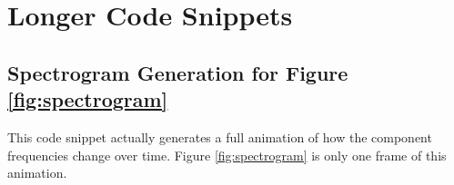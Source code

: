 %

\chapter{Longer Code Snippets} %
\label{appendix:code} %

\section{Spectrogram Generation for Figure \ref{fig:spectrogram}}
\label{sec:code-spectrogram}
This code snippet actually generates a full animation of how the component frequencies change over time.
Figure \ref{fig:spectrogram} is only one frame of this animation.

